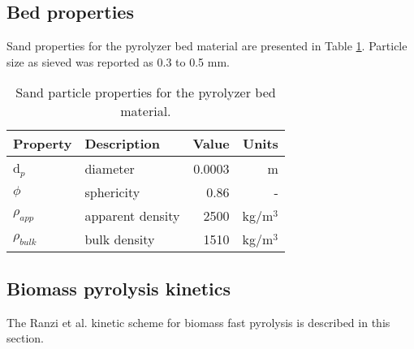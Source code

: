 \subsection{Bed properties}

Sand properties for the pyrolyzer bed material are presented in Table \ref{tab:sand-properties}. Particle size as sieved was reported as 0.3 to 0.5 mm.

\begin{table}[H]
    \centering
    \caption{Sand particle properties for the pyrolyzer bed material.}
    \label{tab:sand-properties}
    \begin{tabular}{llrr}
        \toprule
        Property & Description & Value & Units \\
        \midrule
        d$_p$ & diameter & 0.0003 & m \\
        $\phi$ & sphericity & 0.86 & - \\
        $\rho_{app}$ & apparent density & 2500 & kg/m$^3$ \\
        $\rho_{bulk}$ & bulk density & 1510 & kg/m$^3$ \\
        \bottomrule
    \end{tabular}
\end{table}

\subsection{Biomass pyrolysis kinetics}

The Ranzi et al. kinetic scheme for biomass fast pyrolysis is described in this section.

